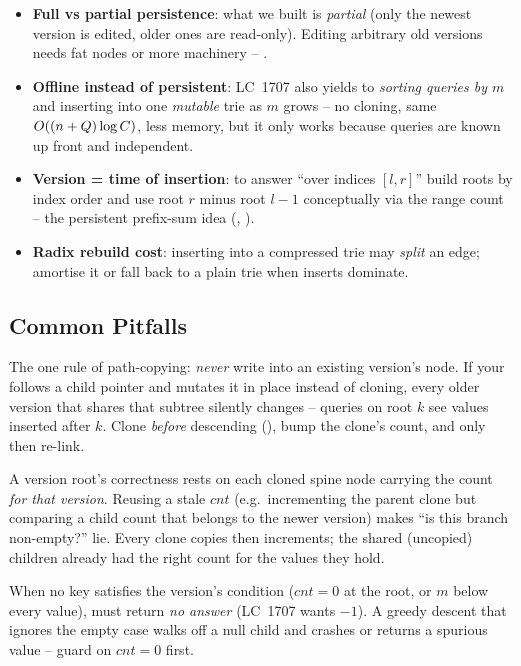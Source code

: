 \begin{itemize}[nosep]
  \item \textbf{Full vs partial persistence}: what we built is \emph{partial} (only the newest version is
        edited, older ones are read-only). Editing arbitrary old versions needs fat nodes or more machinery
        -- . \hfill{}
  \item \textbf{Offline instead of persistent}: LC~1707 also yields to \emph{sorting queries by $m$} and
        inserting into one \emph{mutable} trie as $m$ grows -- no cloning, same $O((n+Q)\log C)$, less
        memory, but it only works because queries are known up front and independent. \hfill{}
  \item \textbf{Version = time of insertion}: to answer ``over indices $[l,r]$'' build roots by index order
        and use root $r$ minus root $l{-}1$ conceptually via the range count -- the persistent prefix-sum
        idea (, ). \hfill{}
  \item \textbf{Radix rebuild cost}: inserting into a compressed trie may \emph{split} an edge; amortise it
        or fall back to a plain trie when inserts dominate. \hfill{}
\end{itemize}

\subsection{Common Pitfalls}

\begin{warningbox}
The one rule of path-copying: \emph{never} write into an existing version's node. If your 
follows a child pointer and mutates it in place instead of cloning, every older version that shares that
subtree silently changes -- queries on root $k$ see values inserted after $k$. Clone \emph{before}
descending (), bump the clone's count, and only then re-link.
\end{warningbox}
\begin{warningbox}
A version root's correctness rests on each cloned spine node carrying the count \emph{for that version}.
Reusing a stale $\mathit{cnt}$ (e.g.\ incrementing the parent clone but comparing a child count that
belongs to the newer version) makes ``is this branch non-empty?'' lie. Every clone copies then increments;
the shared (uncopied) children already had the right count for the values they hold.
\end{warningbox}
\begin{warningbox}
When no key satisfies the version's condition ($\mathit{cnt}=0$ at the root, or $m$ below every value),
 must return \emph{no answer} (LC~1707 wants $-1$). A greedy descent that ignores the empty
case walks off a null child and crashes or returns a spurious value -- guard on $\mathit{cnt}=0$ first.
\end{warningbox}

